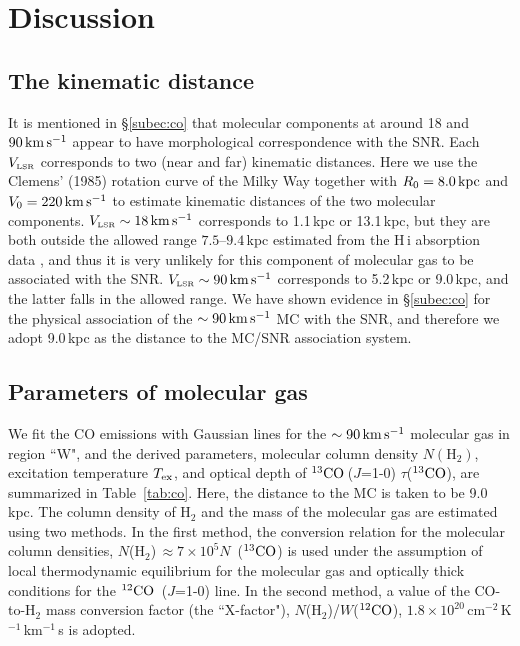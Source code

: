 \documentclass[12pt,preprint]{aastex}
\newcommand{\ssst}{\scriptscriptstyle}
\newcommand{\VLSR}{V_{\ssst\rm LSR}}
\newcommand{\twCO}{$^{12}{\rm CO}$}
\newcommand{\thCO}{$^{13}{\rm CO}$}
\newcommand{\Jotz}{$J$=1-0}
\begin{document}
\section{Discussion}

\subsection{The kinematic distance}
\label{S:distance}
It is mentioned in \S\ref{subec:co} that molecular components 
at around 18 and $90\,{\rm km}\,{\rm s}^{-1}$ appear to have 
morphological correspondence with the SNR.
Each $\VLSR$ corresponds to two (near and far) kinematic distances.
Here we use the Clemens' (1985)  
rotation curve of the Milky Way \citep{Clemens1985}  together with $R_0=8.0\,{\rm kpc}$ 
\citep{Reid1993} and $V_0=220\,{\rm km}\,{\rm s}^{-1}$ to estimate kinematic distances
of the two molecular components.
$\VLSR\sim18\km\ps$  corresponds to  1.1\,kpc or  13.1\,kpc,
but they are both outside the allowed range $7.5$--$9.4$\,kpc estimated from
the H\,{\sc i} absorption data \citep{Tian2008kes73},  and thus it is very unlikely for
this component of molecular gas to be associated with the SNR.
$\VLSR\sim90\km\ps$ corresponds to  5.2\,kpc 
or  9.0\,kpc, and the latter  falls  in the allowed range. 
We have shown evidence  in \S\ref{subec:co}  for the physical association
of the $\sim90\,{\rm km}\,{\rm s}^{-1}$ MC with the SNR, and therefore 
we adopt 9.0\,kpc as the distance to the MC/SNR association system.



\subsection{Parameters of molecular gas}

We fit the CO emissions with Gaussian lines for the $\sim90 \,{\rm km}\,{\rm s}^{-1}$
molecular gas in region ``W", and the derived parameters,
molecular column density $N(\mbox{H}_2)$,  excitation temperature 
$T_{\rm ex}$, and optical depth of \thCO\,(\Jotz) $\tau$(\thCO),
are summarized in Table~\ref{tab:co}.
Here, the distance to the MC is taken to be 9.0\, kpc.
The column density of H$_2$ and the mass of the molecular gas
are estimated using two methods.
In the first method,
the conversion relation for the molecular
column densities,
$N$(H$_2$)\,$\approx 7\times 10^5 N$~(\thCO) \citep{Frerking1982}
is used under the assumption of local thermodynamic equilibrium
for the molecular gas and optically thick conditions for
the \twCO\ (\Jotz) line.
In the second method,
a value of the CO-to-H$_2$ mass conversion factor (the ``X-factor"),
$N$(H$_2$)/$W$(\twCO),
$1.8\times 10^{20}$\,cm$^{-2}$\,K$^{-1}$\,km$^{-1}$\,s
\citep{Dame2001co} is adopted.
\end{document}
